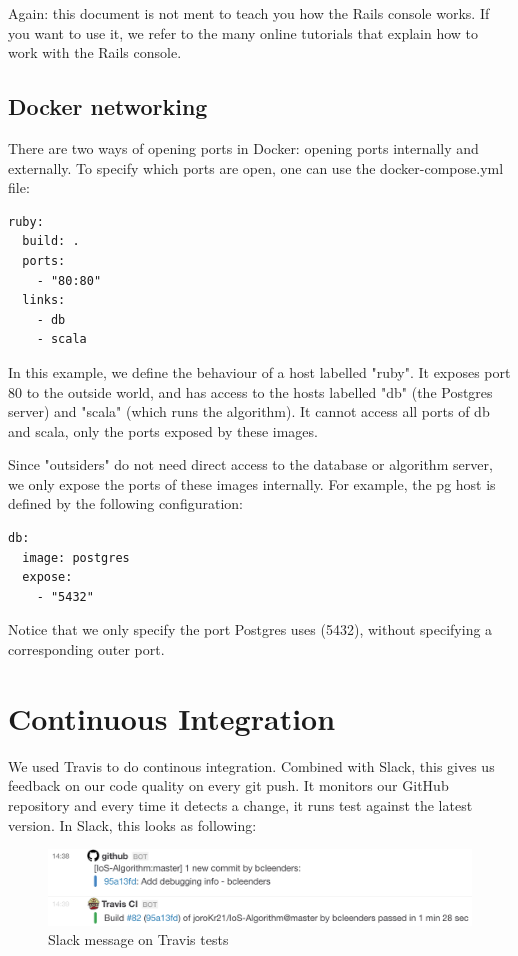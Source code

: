 Again: this document is not ment to teach you how the Rails console works. If you want to use it, we refer to the many online tutorials that explain how to work with the Rails console.

\subsection{Docker networking}
There are two ways of opening ports in Docker: opening ports internally and externally. To specify which ports are open, one can use the docker-compose.yml file:

\begin{verbatim}
ruby:
  build: .
  ports:
    - "80:80"
  links:
    - db
    - scala
\end{verbatim}

In this example, we define the behaviour of a host labelled "ruby". It exposes port 80 to the outside world, and has access to the hosts labelled "db" (the Postgres server) and "scala" (which runs the algorithm). It cannot access all ports of db and scala, only the ports exposed by these images.

Since "outsiders" do not need direct access to the database or algorithm server, we only expose the ports of these images internally. For example, the pg host is defined by the following configuration:

\begin{verbatim}
db:
  image: postgres
  expose:
    - "5432"
\end{verbatim}

Notice that we only specify the port Postgres uses (5432), without specifying a corresponding outer port.

\section{Continuous Integration}
We used Travis to do continous integration. Combined with Slack, this gives us feedback on our code quality on every git push. It monitors our GitHub repository and every time it detects a change, it runs test against the latest version. In Slack, this looks as following:

\begin{figure}[H]
	\caption{Slack message on Travis tests}
	\label{fig:slack_ci}
	\centering
	\includegraphics[width=14cm]{img/slack_ci}
\end{figure}

